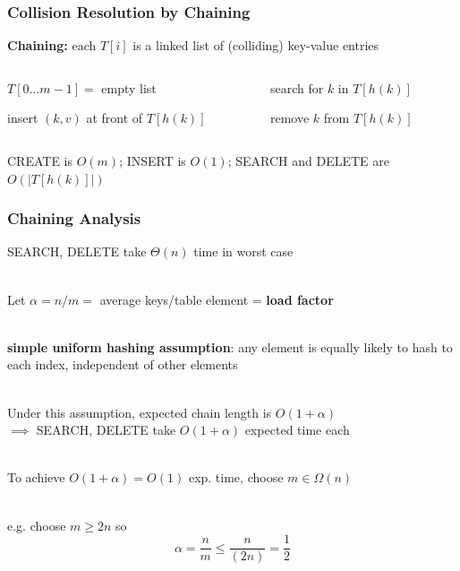 \documentclass{beamer}
\newcommand{\stanza}{ \\~\ }
\begin{document}
\begin{frame} \frametitle{Collision Resolution by Chaining}
\textbf{Chaining:} each $T[i]$ is a linked list of (colliding) key-value entries
\vspace{.5cm}
\begin{columns}
\begin{column}{0.5\textwidth}
  {\small

  \begin{algorithmic}[1]
    \State $T[0 \ldots m-1] = $ empty list
    \EndFunction
  \end{algorithmic}

  \begin{algorithmic}[1]
    \State insert $(k, v)$ at front of $T[h(k)]$
    \EndFunction
  \end{algorithmic}
  }
\end{column}
\begin{column}{0.5\textwidth}
  {\small

  \begin{algorithmic}[1]
    \State search for $k$ in $T[h(k)]$
    \EndFunction
  \end{algorithmic}

  \begin{algorithmic}[1]
    \State remove $k$ from $T[h(k)]$
    \EndFunction
  \end{algorithmic}
  }
\end{column}
\end{columns}
\vspace{.5cm}
CREATE is $O(m)$; INSERT is $O(1)$; SEARCH and DELETE are $O(|T[h(k)]|)$
\end{frame}

\begin{frame} \frametitle{Chaining Analysis}
SEARCH, DELETE take $\Theta(n)$ time in worst case \stanza


Let $\alpha = n/m = $ average keys/table element = \textbf{load factor} \stanza

\textbf{simple uniform hashing assumption}: any element is equally likely to
hash to each index, independent of other elements \stanza

Under this assumption, expected chain length is $O(1+\alpha)$ \\
$\implies$ SEARCH, DELETE take $O(1+\alpha)$ expected time each \stanza

To achieve $O(1+\alpha)=O(1)$ exp. time, choose $m \in \Omega(n)$ \stanza

e.g. choose $m \geq 2n$ so
\[ \alpha = \frac{n}{m} \leq \frac{n}{(2n)} = \frac{1}{2} \]
\end{frame}
\end{document}

